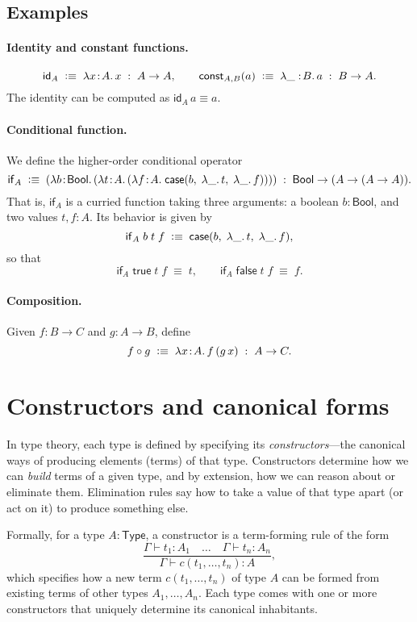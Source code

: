\documentclass{article}
\newcommand{\Type}{\ensuremath{\mathsf{Type}}}
\newcommand{\defeq}{\vcentcolon\equiv}
\newcommand{\caseof}{\mathsf{case}}
\newcommand{\Bool}{\mathsf{Bool}}
\newcommand{\jdeq}{\equiv}                 %
\begin{document}
\subsection*{Examples}

\paragraph{Identity and constant functions.}
\[
\mathsf{id}_A \;\defeq\; \lambda x\!:\!A.\,x \;:\; A \to A,
\qquad
\mathsf{const}_{A,B}(a) \;\defeq\; \lambda \_:\!B.\,a \;:\; B \to A.
\]
The identity can be computed as \(\mathsf{id}_A\,a \jdeq a\).

\paragraph{Conditional function.}
We define the higher-order conditional operator
\[
\mathsf{if}_A
\;\defeq\;
(\lambda b\!:\!\Bool.\,
  (\lambda t\!:\!A.\,
    (\lambda f\!:\!A.\;
      \caseof(b,\; \lambda\_.\,t,\; \lambda\_.\,f))))
\;:\;
\Bool \to (A \to (A \to A)).
\]
That is, \(\mathsf{if}_A\) is a curried function taking three arguments:
a boolean \(b:\Bool\), and two values \(t,f:A\).
Its behavior is given by
\[
\mathsf{if}_A \; b \; t \; f
\;\defeq\;
\caseof(b,\; \lambda\_.\,t,\; \lambda\_.\,f),
\]
so that
\[
\mathsf{if}_A \; \mathsf{true} \; t \; f \;\jdeq\; t,
\qquad
\mathsf{if}_A \; \mathsf{false} \;t \; f \;\jdeq\; f.
\]


\paragraph{Composition.}
Given \(f:B\to C\) and \(g:A\to B\), define
\[
f \circ g \;\defeq\; \lambda x\!:\!A.\, f\,(g\,x) \;:\; A \to C.
\]

\section{Constructors and canonical forms}

In type theory, each type is defined by specifying its \emph{constructors}—the canonical ways of producing elements (terms) of that type.  
Constructors determine how we can \emph{build} terms of a given type, and by extension, how we can reason about or eliminate them. Elimination rules say how to take a value of that type apart (or act on it) to produce something else.

Formally, for a type \(A : \Type\), a constructor is a term-forming rule of the form
\[
\frac{\Gamma \vdash t_1 : A_1 \quad \dots \quad \Gamma \vdash t_n : A_n}{\Gamma \vdash c(t_1,\dots,t_n) : A},
\]
which specifies how a new term \(c(t_1,\dots,t_n)\) of type \(A\) can be formed from existing terms of other types \(A_1,\dots,A_n\).  
Each type comes with one or more constructors that uniquely determine its canonical inhabitants.
\end{document}
